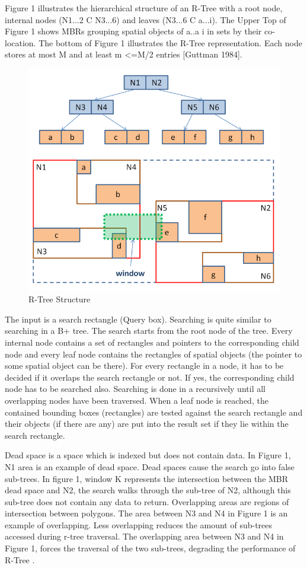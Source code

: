 Figure 1 illustrates the hierarchical structure of an R-Tree with a root node, internal nodes (N1...2 C N3...6) and leaves (N3...6 C a...i). The Upper Top of Figure 1 shows MBRs grouping spatial objects of a..a i in sets by their co-location. The bottom of Figure 1 illustrates the R-Tree representation. Each node stores at most M and at least m <=M/2 entries [Guttman 1984].

\begin{figure}[ht]
\centering
\includegraphics[width=.5\textwidth]{r-tree-structure.png}
\caption{R-Tree Structure}
\label{fig:R-Tree Structure}
\end{figure}

The input is a search rectangle (Query box). Searching is quite similar to searching in a B+ tree. The search starts from the root node of the tree. Every internal node contains a set of rectangles and pointers to the corresponding child node and every leaf node contains the rectangles of spatial objects (the pointer to some spatial object can be there). For every rectangle in a node, it has to be decided if it overlaps the search rectangle or not. If yes, the corresponding child node has to be searched also. Searching is done in a recursively until all overlapping nodes have been traversed. When a leaf node is reached, the contained bounding boxes (rectangles) are tested against the search rectangle and their objects (if there are any) are put into the result set if they lie within the search rectangle.
	
	Dead space is a space which is indexed but does not contain data. In Figure 1, N1 area is an example of dead space. Dead spaces cause the search go into false sub-trees. In figure 1, window K represents the intersection between the MBR dead space and N2, the search walks through the sub-tree of N2, although this sub-tree does not contain any data to return.
Overlapping areas are regions of intersection between polygons. The area between N3 and N4 in Figure 1 is an example of overlapping. Less overlapping reduces the amount of sub-trees accessed during r-tree traversal. The overlapping area between N3 and N4 in Figure 1, forces the traversal of the two sub-trees, degrading the performance of R-Tree \cite{beckmann1990r}.

